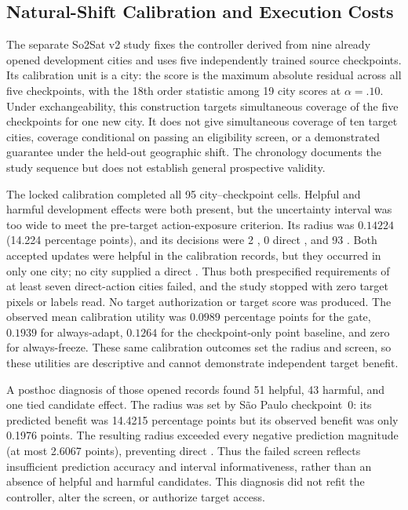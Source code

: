 \subsection{Natural-Shift Calibration and Execution Costs}
\label{sec:nextphase-natural-cost}

The separate So2Sat v2 study fixes the controller derived from nine already
opened development cities and uses five independently trained source checkpoints.
Its calibration unit is a city: the score is the maximum absolute residual across
all five checkpoints, with the 18th order statistic among 19 city scores at
$\alpha=.10$. Under exchangeability, this construction targets simultaneous
coverage of the five checkpoints for one new city. It does not give simultaneous
coverage of ten target cities, coverage conditional on passing an eligibility
screen, or a demonstrated guarantee under the held-out geographic shift.
The chronology documents the study sequence but does not establish general prospective validity.

The locked calibration completed all 95 city--checkpoint cells. Helpful and harmful
development effects were both present, but the uncertainty interval was too wide to
meet the pre-target action-exposure criterion. Its radius was
$0.14224$ (14.224 percentage points), and its decisions were 2 \adapt,
0 direct \freeze, and 93 \abstain. Both accepted updates were helpful in the
calibration records, but they occurred in only one city; no city supplied a
direct \freeze. Thus both prespecified requirements of at least seven direct-action
cities failed, and the study stopped with zero target pixels or labels read.
No target authorization or target score was produced. The observed mean calibration
utility was $0.0989$ percentage points for the gate, $0.1939$ for always-adapt,
$0.1264$ for the checkpoint-only point baseline, and zero for always-freeze.
These same calibration outcomes set the radius and screen, so these utilities
are descriptive and cannot demonstrate independent target benefit.

A posthoc diagnosis of those opened records found 51 helpful, 43 harmful,
and one tied candidate effect. The radius was set by S\~ao Paulo checkpoint~0:
its predicted benefit was 14.4215 percentage points but its observed benefit
was only 0.1976 points. The resulting radius exceeded every negative prediction
magnitude (at most 2.6067 points), preventing direct \freeze. Thus the failed
screen reflects insufficient prediction accuracy and interval informativeness,
rather than an absence of helpful and harmful candidates. This diagnosis did
not refit the controller, alter the screen, or authorize target access.

